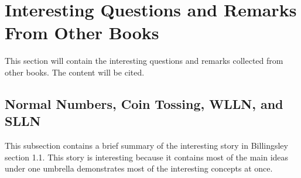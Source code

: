 \section{Interesting Questions and Remarks From Other Books}
This section will contain the interesting questions and remarks collected from other books. The content will be cited.


\subsection{Normal Numbers, Coin Tossing, WLLN, and SLLN}
This subsection contains a brief summary of the interesting story in Billingsley section 1.1. This story is interesting because it contains most of the main ideas under one umbrella demonstrates most of the interesting concepts at once.

